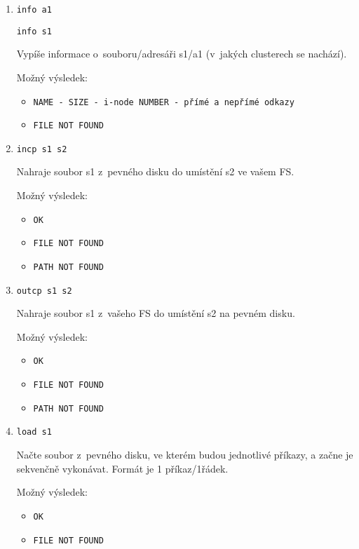 \documentclass[a4paper, 12pt]{report}
\begin{document}
\begin{enumerate}
    \item \texttt{info a1}

    \texttt{info s1}

    Vypíše informace o~souboru/adresáři s1/a1 (v~jakých clusterech se nachází).

    Možný výsledek:

    \begin{itemize}
        \item[] \texttt{NAME - SIZE - i-node NUMBER - přímé a nepřímé odkazy}
        \item[] \texttt{FILE NOT FOUND}
    \end{itemize}

    \item \texttt{incp s1 s2}

    Nahraje soubor s1 z~pevného disku do umístění s2 ve vašem FS.

    Možný výsledek:

    \begin{itemize}
        \item[] \texttt{OK}
        \item[] \texttt{FILE NOT FOUND}
        \item[] \texttt{PATH NOT FOUND}
    \end{itemize}

    \item \texttt{outcp s1 s2}

    Nahraje soubor s1 z~vašeho FS do umístění s2 na pevném disku.

    Možný výsledek:

    \begin{itemize}
        \item[] \texttt{OK}
        \item[] \texttt{FILE NOT FOUND}
        \item[] \texttt{PATH NOT FOUND}
    \end{itemize}

    \item \texttt{load s1}

    Načte soubor z~pevného disku, ve kterém budou jednotlivé příkazy, a začne je sekvenčně
vykonávat. Formát je 1 příkaz/1řádek.

    Možný výsledek:

    \begin{itemize}
        \item[] \texttt{OK}
        \item[] \texttt{FILE NOT FOUND}
    \end{itemize}


\end{enumerate}
\end{document}
